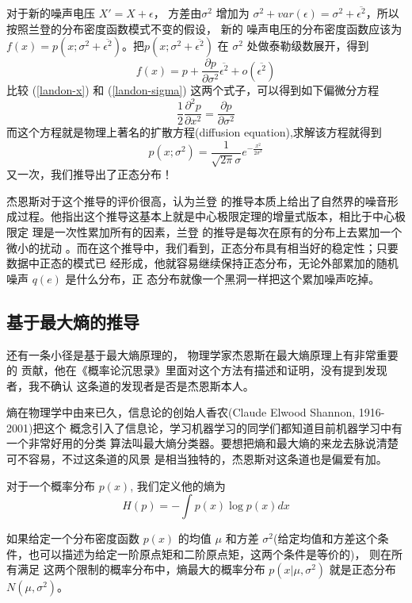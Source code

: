 对于新的噪声电压 $X' = X + \epsilon$， 方差由$\sigma^2$ 增加为 $\sigma^2 + var(\epsilon) =
\sigma^2 + \overline{\epsilon^2}$，所以按照兰登的分布密度函数模式不变的假设， 新的
噪声电压的分布密度函数应该为 $f(x) = p(x; \sigma^2 +  \overline{\epsilon^2})$。把$p(x;
\sigma^2 +  \overline{\epsilon^2})$ 在 $\sigma^2$ 处做泰勒级数展开，得到
\begin{equation}
\label{landon-sigma}
f(x) = p + \frac{\partial p}{\partial \sigma^2}\overline{\epsilon^2} + o(\overline{\epsilon^2})
\end{equation}
比较 (\ref{landon-x}) 和 (\ref{landon-sigma}) 这两个式子，可以得到如下偏微分方程
$$ \frac{1}{2} \frac{\partial^2 p}{\partial x^2} = \frac{\partial p}{\partial \sigma^2} $$
而这个方程就是物理上著名的扩散方程(diffusion equation),求解该方程就得到
$$ p(x; \sigma^2) = \frac{1}{\sqrt{2\pi}\sigma}e^{-\frac{x^2}{2\sigma^2}} $$
又一次，我们推导出了正态分布！

杰恩斯对于这个推导的评价很高，认为兰登 的推导本质上给出了自然界的噪音形
成过程。他指出这个推导这基本上就是中心极限定理的增量式版本，相比于中心极限定
理是一次性累加所有的因素，兰登 的推导是每次在原有的分布上去累加一个微小的扰动
。而在这个推导中，我们看到，正态分布具有相当好的稳定性；只要数据中正态的模式已
经形成，他就容易继续保持正态分布，无论外部累加的随机噪声 $q(e)$ 是什么分布，正
态分布就像一个黑洞一样把这个累加噪声吃掉。

\subsection{基于最大熵的推导}

还有一条小径是基于最大熵原理的， 物理学家杰恩斯在最大熵原理上有非常重要的
贡献，他在《概率论沉思录》里面对这个方法有描述和证明，没有提到发现者，我不确认
这条道的发现者是否是杰恩斯本人。

熵在物理学中由来已久，信息论的创始人香农(Claude Elwood Shannon, 1916-2001)把这个
概念引入了信息论，学习机器学习的同学们都知道目前机器学习中有一个非常好用的分类
算法叫最大熵分类器。要想把熵和最大熵的来龙去脉说清楚可不容易，不过这条道的风景
是相当独特的，杰恩斯对这条道也是偏爱有加。

对于一个概率分布 $p(x)$, 我们定义他的熵为
$$H(p) = -\int p(x)\log p(x) dx$$

如果给定一个分布密度函数 $p(x)$ 的均值 $\mu$ 和方差 $\sigma^2$(给定均值和方差这个条
件，也可以描述为给定一阶原点矩和二阶原点矩，这两个条件是等价的)， 则在所有满足
这两个限制的概率分布中，熵最大的概率分布 $p(x|\mu, \sigma^2)$ 就是正态分布
$N(\mu, \sigma^2)$。

